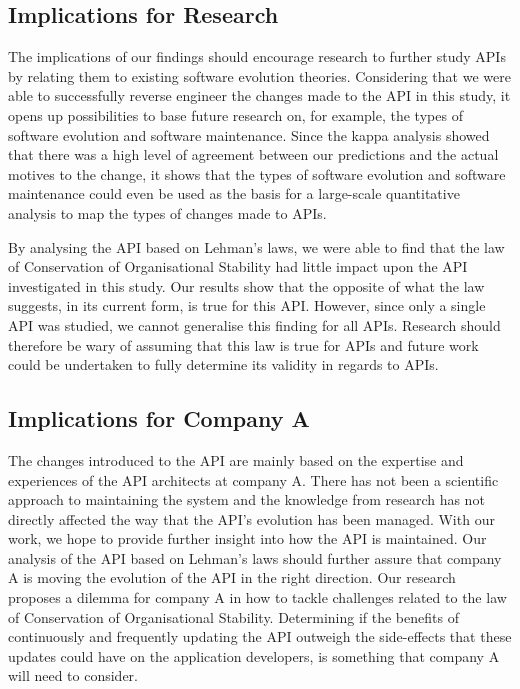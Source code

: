 \documentclass{sig-alternate}
\begin{document}
\subsection{Implications for Research} 
The implications of our findings should encourage research to further study APIs by relating them to existing software evolution theories. Considering that we were able to successfully reverse engineer the changes made to the API in this study, it opens up possibilities to base future research on, for example, the types of software evolution and software maintenance. Since the kappa analysis showed that there was a high level of agreement between our predictions and the actual motives to the change, it shows that the types of software evolution and software maintenance could even be used as the basis for a large-scale quantitative analysis to map the types of changes made to APIs. 

By analysing the API based on Lehman's laws, we were able to find that the law of Conservation of Organisational Stability had little impact upon the API investigated in this study. Our results show that the opposite of what the law suggests, in its current form, is true for this API. However, since only a single API was studied, we cannot generalise this finding for all APIs. Research should therefore be wary of assuming that this law is true for APIs and future work could be undertaken to fully determine its validity in regards to APIs.

 

\subsection{Implications for Company A}
The changes introduced to the API are mainly based on the expertise and experiences of the API architects at company A. There has not been a scientific approach to maintaining the system and the knowledge from research has not directly affected the way that the API's evolution has been managed. With our work, we hope to provide further insight into how the API is maintained. Our analysis of the API based on Lehman's laws should further assure that company A is moving the evolution of the API in the right direction. Our research proposes a dilemma for company A in how to tackle challenges related to the law of Conservation of Organisational Stability. Determining if the benefits of continuously and frequently updating the API outweigh the side-effects that these updates could have on the application developers, is something that company A will need to consider.
\end{document}
